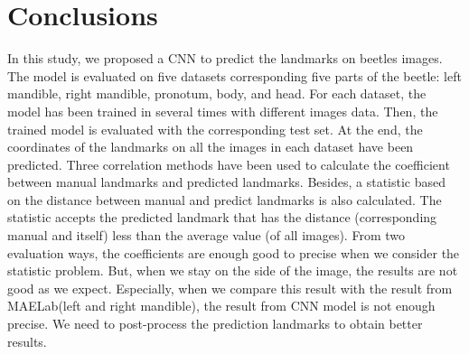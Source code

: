 \documentclass[12pt,a4paper]{article}
\begin{document}
\section{Conclusions}
In this study, we proposed a CNN to predict the landmarks on beetles images. The model is evaluated on five datasets corresponding five parts of the beetle: left mandible, right mandible, pronotum, body, and head. For each dataset, the model has been trained in several times with different images data. Then, the trained model is evaluated with the corresponding test set. At the end, the coordinates of the landmarks on all the images in each dataset have been predicted. Three correlation methods have been used to calculate the coefficient between manual landmarks and predicted landmarks. Besides, a statistic based on the distance between manual and predict landmarks is also calculated. The statistic accepts the predicted landmark that has the distance (corresponding manual and itself) less than the average value (of all images). From two evaluation ways, the coefficients are enough good to precise when we consider the statistic problem. But, when we stay on the side of the image, the results are not good as we expect. Especially, when we compare this result with the result from MAELab(left and right mandible), the result from CNN model is not enough precise. We need to post-process the prediction landmarks to obtain better results.


\pagebreak
\end{document}
